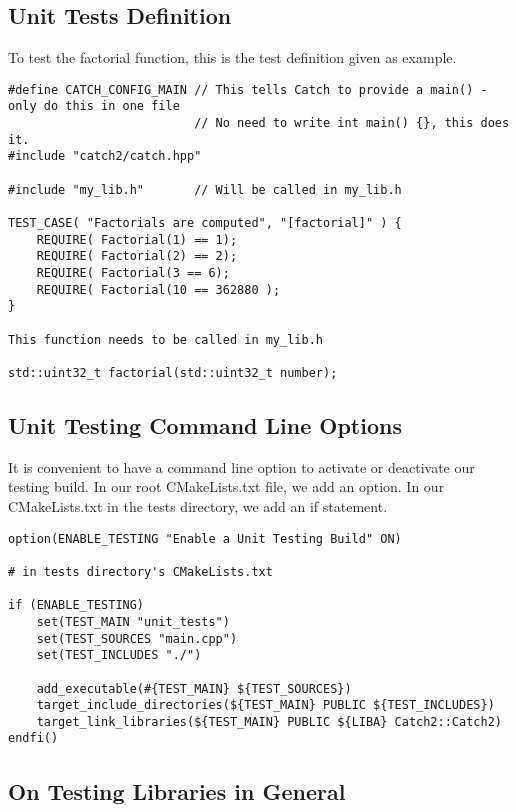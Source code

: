 \subsection{Unit Tests Definition}

To test the factorial function, this is the test definition given as example.

\begin{verbatim}
#define CATCH_CONFIG_MAIN // This tells Catch to provide a main() - only do this in one file
                          // No need to write int main() {}, this does it. 
#include "catch2/catch.hpp"

#include "my_lib.h"       // Will be called in my_lib.h

TEST_CASE( "Factorials are computed", "[factorial]" ) {
    REQUIRE( Factorial(1) == 1);
    REQUIRE( Factorial(2) == 2);
    REQUIRE( Factorial(3 == 6);
    REQUIRE( Factorial(10 == 362880 );
}

This function needs to be called in my_lib.h

std::uint32_t factorial(std::uint32_t number);
\end{verbatim}


\subsection{Unit Testing Command Line Options}

It is convenient to have a command line option to activate or deactivate our testing build. In our root CMakeLists.txt
file, we add an option. In our CMakeLists.txt in the tests directory, we add an if statement. 

\begin{verbatim}
option(ENABLE_TESTING "Enable a Unit Testing Build" ON) 

# in tests directory's CMakeLists.txt

if (ENABLE_TESTING)
    set(TEST_MAIN "unit_tests")
    set(TEST_SOURCES "main.cpp")
    set(TEST_INCLUDES "./")

    add_executable(#{TEST_MAIN} ${TEST_SOURCES})
    target_include_directories(${TEST_MAIN} PUBLIC ${TEST_INCLUDES})
    target_link_libraries(${TEST_MAIN} PUBLIC ${LIBA} Catch2::Catch2)
endfi()
\end{verbatim}


\subsection{On Testing Libraries in General}

